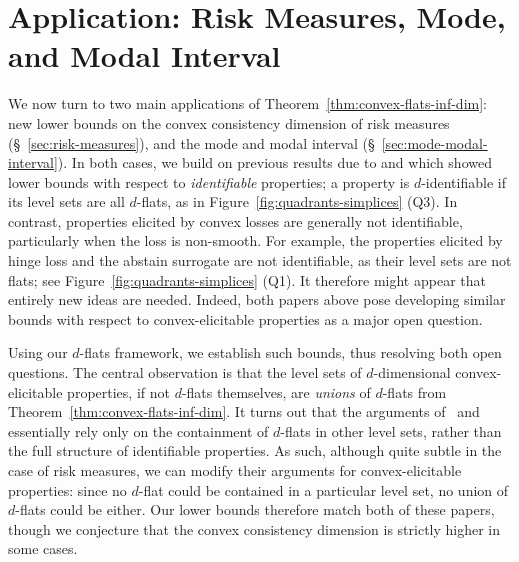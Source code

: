 \documentclass[11pt]{article} %
\newcommand{\Comments}{1}
\newcommand{\mytodo}[2]{\ifnum\Comments=1%
	\todo[linecolor=#1!80!black,backgroundcolor=#1,bordercolor=#1!80!black]{#2}\fi}
\newcommand{\btw}[1]{}%
\begin{document}
\section{Application: Risk Measures, Mode, and Modal Interval}\label{sec:contin-consis}

We now turn to two main applications of Theorem~\ref{thm:convex-flats-inf-dim}: new lower bounds on the convex consistency dimension of risk measures (\S~\ref{sec:risk-measures}), and the mode and modal interval (\S~\ref{sec:mode-modal-interval}).
In both cases, we build on previous results due to \citet{frongillo2020elicitation} and \citet{dearborn2020indirect} which showed lower bounds with respect to \emph{identifiable} properties;
a property is $d$-identifiable if its level sets are all $d$-flats, as in Figure~\ref{fig:quadrants-simplices} (Q3).
In contrast, properties elicited by convex losses are generally not identifiable, particularly when the loss is non-smooth.
For example, the properties elicited by hinge loss and the abstain surrogate are not identifiable, as their level sets are not flats; see Figure~\ref{fig:quadrants-simplices} (Q1).
It therefore might appear that entirely new ideas are needed.
Indeed, both papers above pose developing similar bounds with respect to convex-elicitable properties as a major open question.

Using our $d$-flats framework, we establish such bounds, thus resolving both open questions.
The central observation is that the level sets of $d$-dimensional convex-elicitable properties, if not $d$-flats themselves, are \emph{unions} of $d$-flats from Theorem~\ref{thm:convex-flats-inf-dim}.
It turns out that the arguments of~\citet{frongillo2020elicitation} and~\citet{dearborn2020indirect} essentially rely only on the containment of $d$-flats in other level sets, rather than the full structure of identifiable properties.
As such, although quite subtle in the case of risk measures, we can modify their arguments for convex-elicitable properties: since no $d$-flat could be contained in a particular level set, no union of $d$-flats could be either.
Our lower bounds therefore match both of these papers, though we conjecture that the convex consistency dimension is strictly higher in some cases.



\btw{OLD intro commented out}
\end{document}

